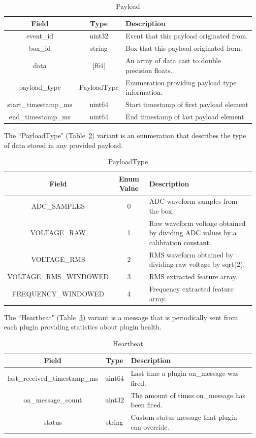\begin{table}[H]
	\centering
	\caption{Payload}
	\begin{tabular}{|c|c| p{8cm} |}
		\hline
		Field & Type & Description  \\
		\hline
		event\_id & uint32 & Event that this payload originated from.  \\
		\hline
		box\_id & string & Box that this payload originated from. \\
		\hline
		data & [f64] & An array of data cast to double precision floats. \\
		\hline
		payload\_type & PayloadType & Enumeration providing payload type information. \\
		start\_timestamp\_ms & uint64 & Start timestamp of first payload element \\
		\hline
		end\_timestamp\_ms & uint64 & End timestamp of last payload element\\
		\hline
	\end{tabular}
	\label{table:Payload}
\end{table}

The ``PayloadType" (Table~\ref{table:PayloadType}) variant is an enumeration that describes the type of data stored in any provided payload.

\begin{table}[H]
	\centering
	\caption{PayloadType}
	\begin{tabular}{|c|c| p{8cm} |}
		\hline
		Field & Enum Value & Description  \\
		\hline
		ADC\_SAMPLES & 0 & ADC waveform samples from the box.  \\
		\hline
		VOLTAGE\_RAW & 1 & Raw waveform voltage obtained by dividing ADC values by a calibration constant. \\
		\hline
		VOLTAGE\_RMS & 2 & RMS waveform obtained by dividing raw voltage by sqrt(2). \\
		\hline
		VOLTAGE\_RMS\_WINDOWED & 3 & RMS extracted feature array. \\
		\hline
		FREQUENCY\_WINDOWED & 4 & Frequency extracted feature array. \\
		\hline
	\end{tabular}
	\label{table:PayloadType}
\end{table}

The ``Heartbeat" (Table~\ref{table:Heartbeat}) variant is a message that is periodically sent from each plugin providing statistics about plugin health.

\begin{table}[H]
	\centering
	\caption{Heartbeat}
	\begin{tabular}{|c|c|p{8cm}|}
		\hline
		Field & Type & Description  \\
		\hline
		last\_received\_timestamp\_ms & uint64 & Last time a plugin on\_message was fired.  \\
		\hline
		on\_message\_count & uint32 & The amount of times on\_message has been fired. \\
		\hline
		status & string & Custom status message that plugin can override. \\
		\hline
	\end{tabular}
	\label{table:Heartbeat}
\end{table}

